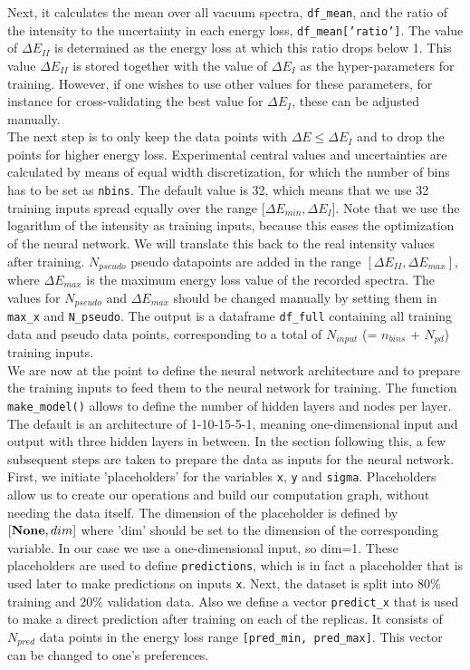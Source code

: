 Next, it calculates the mean over all vacuum spectra, {\tt df\_mean}, and the ratio of the 
intensity to the uncertainty in each energy loss, {\tt df\_mean['ratio']}. 
%
The value of $\Delta E_{II}$ is determined as the energy loss at which this ratio
drops below 1. 
%
This value $\Delta E_{II}$ is stored together with the value of $\Delta E_I$
as the hyper-parameters for training. 
%
However, if one wishes to use other values for these parameters, for instance for 
cross-validating the best value for $\Delta E_I$, these can be adjusted manually.
\\

The next step is to only keep the data points with $\Delta E \le \Delta E_I$  
and to drop the points for higher energy loss.
%
Experimental central values and uncertainties are calculated by means of equal width 
discretization, for which the number of bins has to be set as {\tt nbins}. 
%
The default value is 32, which means that we use 32 training inputs spread equally
over the range [$ \Delta E_{min}, \Delta E_I$]. 
%
Note that we use the logarithm of the intensity as training inputs, because this eases
the optimization of the neural network. We will translate this back to the real intensity
values after training.
%
$N_{pseudo}$ pseudo datapoints are added in the range $[\Delta E_{II}, \Delta E_{max}]$, where $ \Delta E_{max}$
is the maximum energy loss value of the recorded spectra. 
%
The values for $N_{pseudo}$ and $\Delta E_{max}$ should be changed manually by 
setting them in {\tt max\_x} and {\tt N\_pseudo}. 
%
The output is a dataframe {\tt df\_full} containing all training data and pseudo data points, 
corresponding to a total of $N_{input}$ (= $n_{bins}$ + $N_{pd}$) training inputs.
\\

We are now at the point to define the neural network architecture and to prepare the
training inputs to feed them to the neural network for training. 
%
The function {\tt make\_model()} allows to define the number of hidden layers and 
nodes per layer. The default is an architecture of 1-10-15-5-1, meaning one-dimensional 
input and output with three hidden layers in between.
%
In the section following this, a few subsequent steps are taken to prepare the data
as inputs for the neural network. 
%
First, we initiate 'placeholders' for the variables
{\tt x}, {\tt y} and {\tt sigma}. Placeholders allow us to create our operations and 
build our computation graph, without needing the data itself. 
%
The dimension of the placeholder is defined by {\tt $[{\bf None}, dim]$} where 'dim'
should be set to the dimension of the corresponding variable. In our case we use a 
one-dimensional input, so dim=1. 
%
These placeholders are used to define {\tt predictions}, which is in fact a placeholder that is used 
later to make predictions on inputs {\tt x}. 
%
Next, the dataset is split into 80\% training and
20\% validation data.
%
Also we define a vector {\tt predict\_x} that is used to make a direct prediction after training
on each of the replicas. It consists of $N_{pred}$ data points in the energy loss range
{\tt [pred\_min, pred\_max]}. This vector can be changed to one's preferences. 
%
\\

